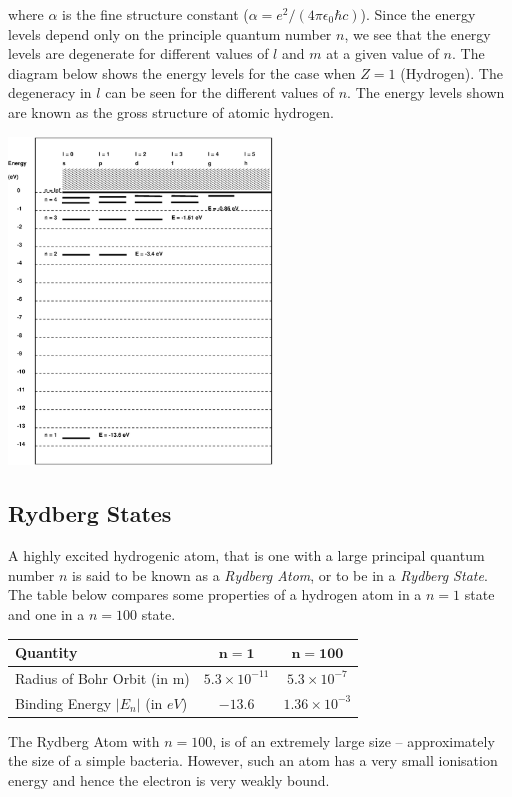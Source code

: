 \documentclass[a4paper]{serif}
\begin{document}
    where $\alpha$ is the fine structure constant 
    ($ \alpha = e^2 / (4 \pi \epsilon_0 \hbar c) $).
    Since the energy levels depend only on the principle quantum number $n$, we see
    that the energy levels are degenerate for different values of $l$ and $m$ at a 
    given value of $n$.
    The diagram below shows the energy levels for the case when $Z = 1$ (Hydrogen).
    The degeneracy in $l$ can be seen for the different values of $n$.
    The energy levels shown are known as the gross structure of atomic hydrogen.
    \begin{center}
        \includegraphics[width=7cm]{levels.eps}
    \end{center}

    \subsection{Rydberg States}
    A highly excited hydrogenic atom, that is one with a large principal quantum 
    number $n$ is said to be known as a \emph{Rydberg Atom}, or to be in a
    \emph{Rydberg State}.
    The table below compares some properties of a hydrogen atom in a $n=1$ state
    and one in a $n=100$ state.
    \begin{center}
    \begin{tabular}{|p{2.5cm}|c|c|} \hline
       {\bf Quantity} & $\mathbf{n = 1}$ & $\mathbf{n = 100}$ \\ \hline \hline
       Radius of Bohr Orbit (in m) &  $5.3 \times 10^{-11}$ & $5.3 \times 10^{-7}$ \\ \hline
       Binding Energy $|E_n|$ (in $eV$)  &  $-13.6$ & $1.36 \times 10^{-3}$ \\ \hline
    \end{tabular}
    \end{center}
    The Rydberg Atom with $n = 100$, is of an extremely large size -- approximately the size
    of a simple bacteria. However, such an atom has a very small ionisation energy and hence
    the electron is very weakly bound.
\end{document}
